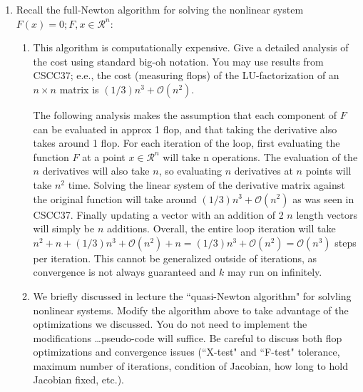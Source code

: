 \documentclass{article}
\begin{document}
\thispagestyle{fancy}
\begin{enumerate}
    \item Recall the full-Newton algorithm for solving the nonlinear system $F(x) = 0; F,x\in \mathcal{R}^n:$

        \begin{algorithm}[H]
            \SetAlgoNoLine
            \SetEndCharOfAlgoLine{}
        \end{algorithm}
        \begin{enumerate}
            \item This algorithm is computationally expensive. Give a detailed analysis of the cost using standard big-oh notation. You may use results from CSCC37; e.e., the cost (measuring flops) of the LU-factorization of an $n \times n$ matrix is $(1/3)n^3 + \mathcal O (n^2)$.

                The following analysis makes the assumption that each component of $F$ can be evaluated in approx 1 flop, and that taking the derivative also takes around 1 flop. For each iteration of the loop, first evaluating the function $F$ at a point $x \in \mathcal{R}^n$ will take n operations. The evaluation of the $n$ derivatives will also take $n$, so evaluating $n$ derivatives at $n$ points will take $n^2$ time. Solving the linear system of the derivative matrix against the original function will take around $(1/3)n^3 + \mathcal{O}(n^2)$ as was seen in CSCC37. Finally updating a vector with an addition of 2 $n$ length vectors will simply be $n$ additions. Overall, the entire loop iteration will take $n^2 + n + (1/3)n^3 + \mathcal{O}(n^2) + n = (1/3)n^3 + \mathcal{O}(n^2) = \mathcal{O}(n^3)$ steps per iteration. This cannot be generalized outside of iterations, as convergence is not always guaranteed and $k$ may run on infinitely.
            \item We briefly discussed in lecture the ``quasi-Newton algorithm" for solvling nonlinear systems. Modify the algorithm above to take advantage of the optimizations we discussed. You do not need to implement the modifications \dots pseudo-code will suffice. Be careful to discuss both flop optimizations and convergence issues (``X-test" and ``F-test" tolerance, maximum number of iterations, condition of Jacobian, how long to hold Jacobian fixed, etc.).


\end{enumerate}
\end{enumerate}
\end{document}
